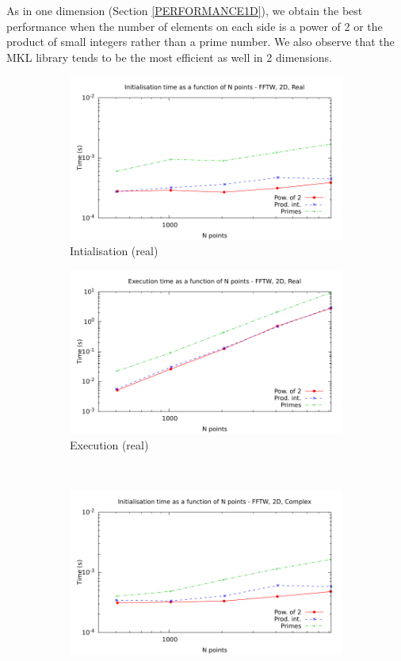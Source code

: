 \documentclass[12pt, a4paper]{article}
\begin{document}
 As in one dimension (Section \ref{PERFORMANCE1D}), we obtain the best performance when the number of elements on each side is a power of 2 or the product of small integers rather than a prime number. We also observe that the MKL library tends to be the most efficient as well in 2 dimensions.
 

\begin{figure}[H]
\captionsetup{width=0.8\linewidth}
\centering
\begin{subfigure}{.5\textwidth}
\centering
\includegraphics[width=.9\linewidth]{graphs/2d-fftw-init-r.pdf}
\caption{Intialisation (real)}
\label{2DFFTWRI}
\end{subfigure}%
\begin{subfigure}{.5\textwidth}
\centering
\includegraphics[width=.9\linewidth]{graphs/2d-fftw-exec-r.pdf}
\caption{Execution (real)}
\label{2DFFTWR}
\end{subfigure}\\
\begin{subfigure}{.5\textwidth}
\centering
\includegraphics[width=.9\linewidth]{graphs/2d-fftw-init-c.pdf}

\end{subfigure}
\end{figure}
\end{document}
